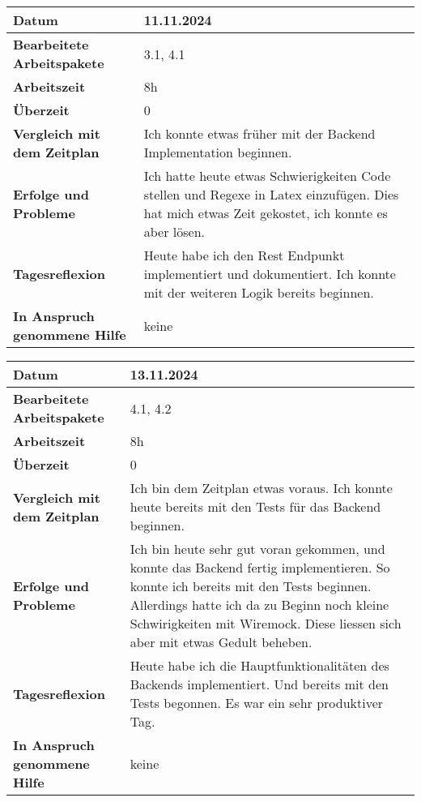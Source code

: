\begin{longtable}{p{}|p{}}
	\hline
	\textbf{Datum}                       & 11.11.2024 \\
	\hline
	\textbf{Bearbeitete Arbeitspakete}   & 3.1, 4.1 \\
	\hline
	\textbf{Arbeitszeit}                 & 8h \\
	\hline
	\textbf{Überzeit}                    & 0 \\
	\hline
	\textbf{Vergleich mit dem Zeitplan}  & Ich konnte etwas früher mit der Backend Implementation beginnen.  \\
	\hline
	\textbf{Erfolge und Probleme}        & Ich hatte heute etwas Schwierigkeiten Code stellen und Regexe in Latex einzufügen. Dies hat mich etwas Zeit gekostet, ich konnte es aber lösen.
	\\
	\hline
	\textbf{Tagesreflexion}              & Heute habe ich den Rest Endpunkt implementiert und dokumentiert. Ich konnte mit der weiteren Logik bereits beginnen. 
	\\
	\hline
	\textbf{In Anspruch genommene Hilfe} & keine \\
	\hline
\end{longtable}\label{tab:arbeitsprotokoll-tag4}
\newpage

\begin{longtable}{p{}|p{}}
	\hline
	\textbf{Datum}                       & 13.11.2024 \\
	\hline
	\textbf{Bearbeitete Arbeitspakete}   & 4.1, 4.2 \\
	\hline
	\textbf{Arbeitszeit}                 & 8h \\
	\hline
	\textbf{Überzeit}                    & 0 \\
	\hline
	\textbf{Vergleich mit dem Zeitplan}  & Ich bin dem Zeitplan etwas voraus. Ich konnte heute bereits mit den Tests für das Backend beginnen.\\
	\hline
	\textbf{Erfolge und Probleme}        & Ich bin heute sehr gut voran gekommen, und konnte das Backend fertig implementieren. So konnte ich bereits mit den Tests beginnen. Allerdings hatte ich da zu Beginn noch kleine Schwirigkeiten mit Wiremock. Diese liessen sich aber mit etwas Gedult beheben.
	\\
	\hline
	\textbf{Tagesreflexion}              & Heute habe ich die Hauptfunktionalitäten des Backends implementiert. Und bereits mit den Tests begonnen. Es war ein sehr produktiver Tag.
	\\
	\hline
	\textbf{In Anspruch genommene Hilfe} & keine \\
	\hline
\end{longtable}\label{tab:arbeitsprotokoll-tag5}
\newpage

